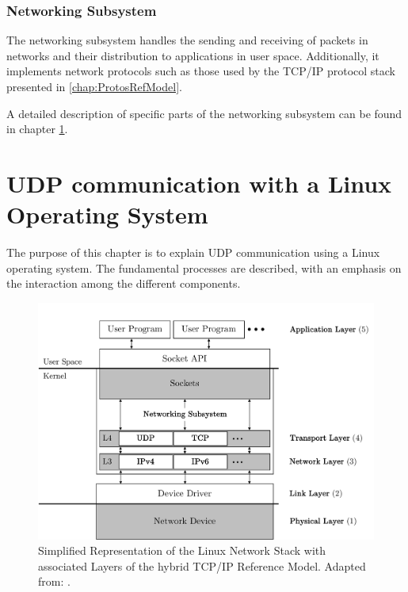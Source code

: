 \subsubsection{Networking Subsystem}
The networking subsystem handles the sending and receiving of packets in networks and their distribution to applications in user space. Additionally, it implements network protocols such as those used by the TCP/IP protocol stack presented in \ref{chap:ProtosRefModel}.

A detailed description of specific parts of the networking subsystem can be found in chapter \ref{chap:LinuxUDPNWStack}.

\clearpage

\section{UDP communication with a Linux Operating System} \label{chap:LinuxUDPNWStack}
The purpose of this chapter is to explain UDP communication using a Linux operating system. The fundamental processes are described, with an emphasis on the interaction among the different components.

\begin{figure}[h]
    \centering
    \includegraphics[width=1\linewidth]{figures/linux_nwstack/image03.pdf}
    \caption[Simplified Representation of the Linux Network Stack with associated Layers of the hybrid TCP/IP Reference Model]{Simplified Representation of the Linux Network Stack with associated Layers of the hybrid TCP/IP Reference Model. Adapted from: \cite{lins06}.}
    \label{fig:NWStack}
\end{figure}


